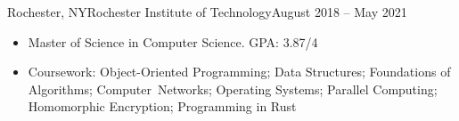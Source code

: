 \begin{cvsubsection}{Rochester, NY}{Rochester Institute of Technology}{August 2018 -- May 2021}
	\begin{itemize}
		\item Master of Science in Computer Science. GPA: 3.87/4
		\item Coursework: Object-Oriented Programming; Data Structures; Foundations of Algorithms; \mbox{Computer Networks;} Operating Systems; Parallel Computing; Homomorphic Encryption; Programming in Rust
	\end{itemize}
\end{cvsubsection}